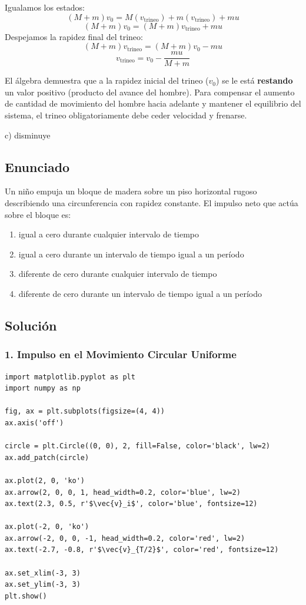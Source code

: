 \documentclass[12pt, a4paper]{article}
\begin{document}
Igualamos los estados:
$$ (M + m)v_0 = M(v_{\text{trineo}}) + m(v_{\text{trineo}}) + mu $$
$$ (M + m)v_0 = (M + m)v_{\text{trineo}} + mu $$
Despejamos la rapidez final del trineo:
$$ (M + m)v_{\text{trineo}} = (M + m)v_0 - mu $$
$$ v_{\text{trineo}} = v_0 - \frac{mu}{M + m} $$

El álgebra demuestra que a la rapidez inicial del trineo ($v_0$) se le está \textbf{restando} un valor positivo (producto del avance del hombre). Para compensar el aumento de cantidad de movimiento del hombre hacia adelante y mantener el equilibrio del sistema, el trineo obligatoriamente debe ceder velocidad y frenarse.

\begin{tcolorbox}[colback=green!5!white, colframe=green!50!black, title=Respuesta Final]
\centering \Large c) disminuye
\end{tcolorbox}

\newpage

\subsection*{Enunciado}
Un niño empuja un bloque de madera sobre un piso horizontal rugoso describiendo una circunferencia con rapidez constante. El impulso neto que actúa sobre el bloque es:
\begin{enumerate}[label=\alph*)]
    \item igual a cero durante cualquier intervalo de tiempo
    \item igual a cero durante un intervalo de tiempo igual a un período
    \item diferente de cero durante cualquier intervalo de tiempo
    \item diferente de cero durante un intervalo de tiempo igual a un período
\end{enumerate}

\subsection*{Solución}

\subsubsection*{1. Impulso en el Movimiento Circular Uniforme}

\begin{verbatim}
import matplotlib.pyplot as plt
import numpy as np

fig, ax = plt.subplots(figsize=(4, 4))
ax.axis('off')

circle = plt.Circle((0, 0), 2, fill=False, color='black', lw=2)
ax.add_patch(circle)

ax.plot(2, 0, 'ko')
ax.arrow(2, 0, 0, 1, head_width=0.2, color='blue', lw=2)
ax.text(2.3, 0.5, r'$\vec{v}_i$', color='blue', fontsize=12)

ax.plot(-2, 0, 'ko')
ax.arrow(-2, 0, 0, -1, head_width=0.2, color='red', lw=2)
ax.text(-2.7, -0.8, r'$\vec{v}_{T/2}$', color='red', fontsize=12)

ax.set_xlim(-3, 3)
ax.set_ylim(-3, 3)
plt.show()
\end{verbatim}
\end{document}
